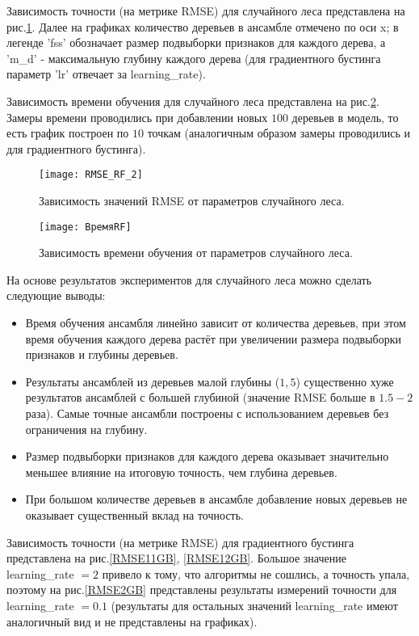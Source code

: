 \documentclass[12pt, a4paper]{article}
\begin{document}
Зависимость точности (на метрике RMSE) для случайного леса представлена на рис.\ref{RMSERF}. Далее на графиках количество деревьев в ансамбле отмечено по оси x; в легенде 'fss' обозначает размер подвыборки признаков для каждого дерева, а 'm\_d' - максимальную глубину каждого дерева (для градиентного бустинга параметр 'lr' отвечает за learning\_rate).


Зависимость времени обучения для случайного леса представлена на рис.\ref{TimeRF}. Замеры времени проводились при добавлении новых $100$ деревьев в модель, то есть график построен по $10$ точкам (аналогичным образом замеры проводились и для градиентного бустинга). 

\begin{figure}[H]
\centering
\texttt{[image: RMSE\_RF\_2]}
\caption{Зависимость значений RMSE от параметров случайного леса.}
\label{RMSERF}
\end{figure}


\begin{figure}[H]
\centering
\texttt{[image: ВремяRF]}
\caption{Зависимость времени обучения от параметров случайного леса.}
\label{TimeRF}
\end{figure}

На основе результатов экспериментов для случайного леса можно сделать следующие выводы:
\begin{itemize}
\item Время обучения ансамбля линейно зависит от количества деревьев, при этом время обучения каждого дерева растёт при увеличении размера подвыборки признаков и глубины деревьев.
\item Результаты ансамблей из деревьев малой глубины ($1, 5$) существенно хуже результатов ансамблей с большей глубиной (значение RMSE больше в $1.5 - 2$ раза). Самые точные ансамбли построены с использованием деревьев без ограничения на глубину.
\item Размер подвыборки признаков для каждого дерева оказывает значительно меньшее влияние на итоговую точность, чем глубина деревьев.
\item При большом количестве деревьев в ансамбле добавление новых деревьев не оказывает существенный вклад на точность.
\end{itemize}

Зависимость точности (на метрике RMSE) для градиентного бустинга представлена на рис.\ref{RMSE11GB}, \ref{RMSE12GB}. Большое значение learning\_rate $= 2$ привело к тому, что алгоритмы не сошлись, а точность упала, поэтому на рис.\ref{RMSE2GB} представлены результаты измерений точности для learning\_rate $= 0.1$ (результаты для остальных значений learning\_rate имеют аналогичный вид и не представлены на графиках). 
\end{document}
